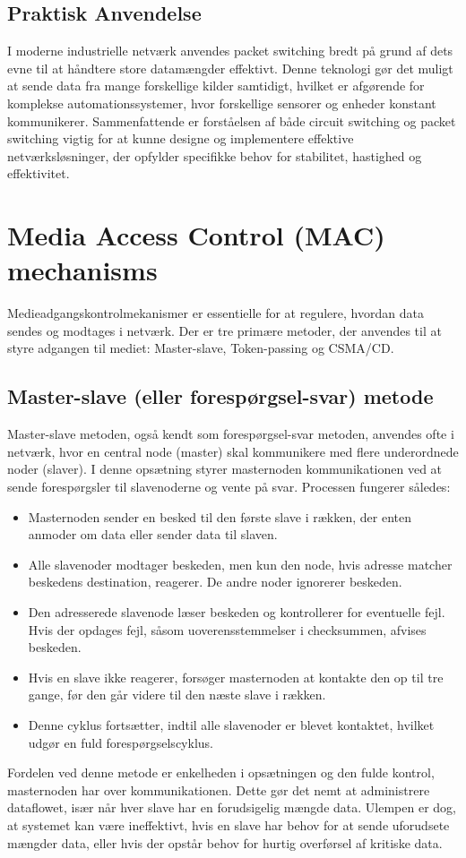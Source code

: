 \subsection{Praktisk Anvendelse}
I moderne industrielle netværk anvendes packet switching bredt på grund af dets evne til at håndtere store datamængder effektivt. Denne teknologi gør det muligt at sende data fra mange forskellige kilder samtidigt, hvilket er afgørende for komplekse automationssystemer, hvor forskellige sensorer og enheder konstant kommunikerer.
\newline
\newline
\noindent Sammenfattende er forståelsen af både circuit switching og packet switching vigtig for at kunne designe og implementere effektive netværksløsninger, der opfylder specifikke behov for stabilitet, hastighed og effektivitet.

\section{Media Access Control (MAC) mechanisms}
Medieadgangskontrolmekanismer er essentielle for at regulere, hvordan data sendes og modtages i netværk. Der er tre primære metoder, der anvendes til at styre adgangen til mediet: Master-slave, Token-passing og CSMA/CD.

\subsection{Master-slave (eller forespørgsel-svar) metode}
Master-slave metoden, også kendt som forespørgsel-svar metoden, anvendes ofte i netværk, hvor en central node (master) skal kommunikere med flere underordnede noder (slaver). I denne opsætning styrer masternoden kommunikationen ved at sende forespørgsler til slavenoderne og vente på svar. Processen fungerer således:
\begin{itemize}
	\item Masternoden sender en besked til den første slave i rækken, der enten anmoder om data eller sender data til slaven.
	\item Alle slavenoder modtager beskeden, men kun den node, hvis adresse matcher beskedens destination, reagerer. De andre noder ignorerer beskeden.
	\item Den adresserede slavenode læser beskeden og kontrollerer for eventuelle fejl. Hvis der opdages fejl, såsom uoverensstemmelser i checksummen, afvises beskeden.
	\item Hvis en slave ikke reagerer, forsøger masternoden at kontakte den op til tre gange, før den går videre til den næste slave i rækken.
	\item Denne cyklus fortsætter, indtil alle slavenoder er blevet kontaktet, hvilket udgør en fuld forespørgselscyklus.
\end{itemize}
Fordelen ved denne metode er enkelheden i opsætningen og den fulde kontrol, masternoden har over kommunikationen. Dette gør det nemt at administrere dataflowet, især når hver slave har en forudsigelig mængde data. Ulempen er dog, at systemet kan være ineffektivt, hvis en slave har behov for at sende uforudsete mængder data, eller hvis der opstår behov for hurtig overførsel af kritiske data.

